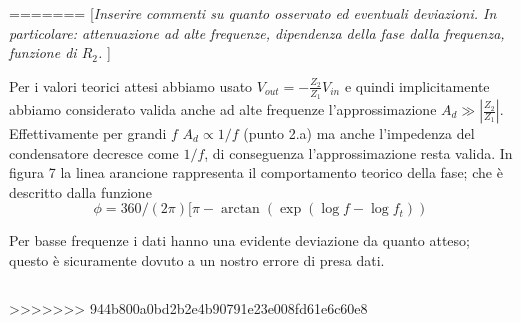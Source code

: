 \documentclass[10pt,a4paper]{article}
\newcommand{\rem}[1]{[\emph{#1}]}
\begin{document}
	
	
	
=======
	\rem{Inserire commenti su quanto osservato ed eventuali deviazioni. 
		In particolare: attenuazione ad alte frequenze, dipendenza della fase dalla frequenza, funzione di $R_2$. }

 Per i valori teorici attesi abbiamo usato $V_{out}= -\frac{Z_2}{Z_1} V_{in}$ e quindi implicitamente abbiamo considerato valida anche ad alte  frequenze l'approssimazione $A_d \gg |\frac{Z_2}{Z_1}|$. Effettivamente per grandi $f$  $A_d\propto 1/f$ (punto 2.a) ma anche l'impedenza del condensatore decresce come $1/f$, di conseguenza l'approssimazione resta valida.
	In figura 7  la linea arancione rappresenta il comportamento teorico della fase; che è descritto dalla funzione \[ \phi = 360/(2\pi)[\pi - \arctan(\exp{(\log f -\log f_t)})\] 

Per basse frequenze i dati hanno una evidente deviazione da quanto atteso; questo è sicuramente dovuto a un nostro errore di presa dati.

	\begin{tabular}{cc}

\end{tabular}

>>>>>>> 944b800a0bd2b2e4b90791e23e008fd61e6c60e8
\end{document}
